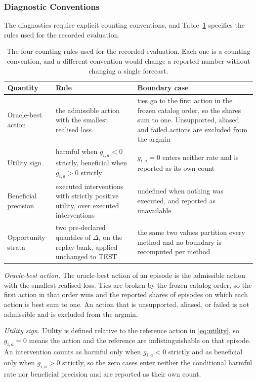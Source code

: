 \documentclass{article}
\begin{document}
\subsubsection{Diagnostic Conventions}
\label{app:diagnostic-conventions}
The diagnostics require explicit counting conventions, and
Table~\ref{tab:app-counting} specifies the rules used for the recorded evaluation.

\begin{table}[htbp]
  \caption{The four counting rules used for the recorded evaluation. Each one is a
  counting convention, and a different convention would change a reported number
  without changing a single forecast.}
  \label{tab:app-counting}
  \centering
  \small
  \setlength{\tabcolsep}{4pt}
\begin{tabular}{@{}p{} p{} p{}@{}}
    \toprule
    Quantity & Rule & Boundary case \\
    \midrule
    Oracle-best action & the admissible action with the smallest realised loss & ties go to the first action in the frozen catalog order, so the shares sum to one. Unsupported, aliased and failed actions are excluded from the argmin \\
    Utility sign & harmful when $g_{i,a} < 0$ strictly, beneficial when $g_{i,a} > 0$ strictly & $g_{i,a} = 0$ enters neither rate and is reported as its own count \\
    Beneficial precision & executed interventions with strictly positive utility, over executed interventions & undefined when nothing was executed, and reported as unavailable \\
    Opportunity strata & two pre-declared quantiles of $\Delta_i$ on the replay bank, applied unchanged to TEST & the same two values partition every method and no boundary is recomputed per method \\
    \bottomrule
  \end{tabular}
\end{table}

\emph{Oracle-best action.} The oracle-best action of an episode is the admissible action with
the smallest realised loss. Ties are broken by the frozen catalog order, so the first action in
that order wins and the reported shares of episodes on which each action is best sum to one. An
action that is unsupported, aliased, or failed is not admissible and is excluded from the
argmin.

\emph{Utility sign.} Utility is defined relative to the reference action in
\eqref{eq:utility}, so $g_{i,a} = 0$ means the action and the reference are indistinguishable on
that episode. An intervention counts as harmful only when $g_{i,a} < 0$ strictly and as
beneficial only when $g_{i,a} > 0$ strictly, so the zero cases enter neither the conditional
harmful rate nor beneficial precision and are reported as their own count.
\end{document}

